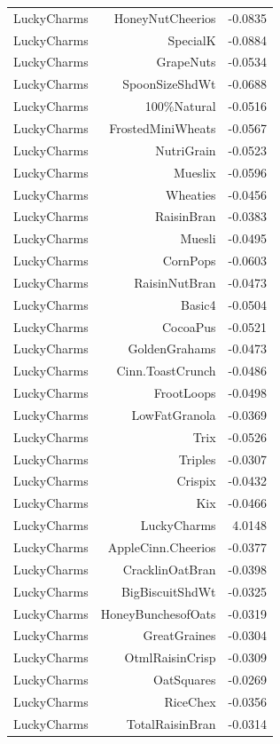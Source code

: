 \begin{longtable}{@{}lrr@{}}
LuckyCharms & HoneyNutCheerios & -0.0835 \\
LuckyCharms & SpecialK & -0.0884 \\
LuckyCharms & GrapeNuts & -0.0534 \\
LuckyCharms & SpoonSizeShdWt & -0.0688 \\
LuckyCharms & 100\%Natural & -0.0516 \\
LuckyCharms & FrostedMiniWheats & -0.0567 \\
LuckyCharms & NutriGrain & -0.0523 \\
LuckyCharms & Mueslix & -0.0596 \\
LuckyCharms & Wheaties & -0.0456 \\
LuckyCharms & RaisinBran & -0.0383 \\
LuckyCharms & Muesli & -0.0495 \\
LuckyCharms & CornPops & -0.0603 \\
LuckyCharms & RaisinNutBran & -0.0473 \\
LuckyCharms & Basic4 & -0.0504 \\
LuckyCharms & CocoaPus & -0.0521 \\
LuckyCharms & GoldenGrahams & -0.0473 \\
LuckyCharms & Cinn.ToastCrunch & -0.0486 \\
LuckyCharms & FrootLoops & -0.0498 \\
LuckyCharms & LowFatGranola & -0.0369 \\
LuckyCharms & Trix & -0.0526 \\
LuckyCharms & Triples & -0.0307 \\
LuckyCharms & Crispix & -0.0432 \\
LuckyCharms & Kix & -0.0466 \\
LuckyCharms & LuckyCharms & 4.0148 \\
LuckyCharms & AppleCinn.Cheerios & -0.0377 \\
LuckyCharms & CracklinOatBran & -0.0398 \\
LuckyCharms & BigBiscuitShdWt & -0.0325 \\
LuckyCharms & HoneyBunchesofOats & -0.0319 \\
LuckyCharms & GreatGraines & -0.0304 \\
LuckyCharms & OtmlRaisinCrisp & -0.0309 \\
LuckyCharms & OatSquares & -0.0269 \\
LuckyCharms & RiceChex & -0.0356 \\
LuckyCharms & TotalRaisinBran & -0.0314 \\

\end{longtable}
